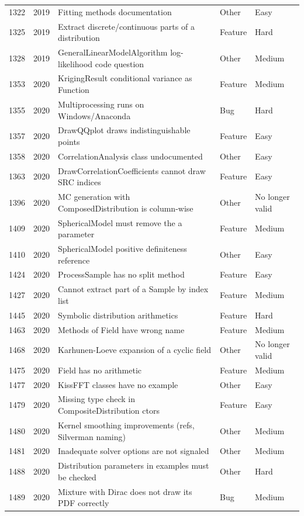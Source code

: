 \documentclass[a4paper,11pt]{article}
\begin{document}
\begin{longtable}{rrp{7.1cm}ll}
1322 & 2019 & Fitting methods documentation & Other & Easy \\
1325 & 2019 & Extract discrete/continuous parts of a distribution & Feature & Hard \\
1328 & 2019 & GeneralLinearModelAlgorithm log-likelihood code question & Other & Medium \\
1353 & 2020 & KrigingResult conditional variance as Function & Feature & Medium \\
1355 & 2020 & Multiprocessing runs on Windows/Anaconda & Bug & Hard \\
1357 & 2020 & DrawQQplot draws indistinguishable points & Feature & Easy \\
1358 & 2020 & CorrelationAnalysis class undocumented & Other & Easy \\
1363 & 2020 & DrawCorrelationCoefficients cannot draw SRC indices & Feature & Easy \\
1396 & 2020 & MC generation with ComposedDistribution is column-wise & Other & No longer valid \\
1409 & 2020 & SphericalModel must remove the a parameter & Feature & Medium \\
1410 & 2020 & SphericalModel positive definiteness reference & Other & Easy \\
1424 & 2020 & ProcessSample has no split method & Feature & Easy \\
1427 & 2020 & Cannot extract part of a Sample by index list & Feature & Medium \\
1445 & 2020 & Symbolic distribution arithmetics & Feature & Hard \\
1463 & 2020 & Methods of Field have wrong name & Feature & Medium \\
1468 & 2020 & Karhunen-Loeve expansion of a cyclic field & Other & No longer valid \\
1475 & 2020 & Field has no arithmetic & Feature & Medium \\
1477 & 2020 & KissFFT classes have no example & Other & Easy \\
1479 & 2020 & Missing type check in CompositeDistribution ctors & Feature & Easy \\
1480 & 2020 & Kernel smoothing improvements (refs, Silverman naming) & Other & Medium \\
1481 & 2020 & Inadequate solver options are not signaled & Other & Medium \\
1488 & 2020 & Distribution parameters in examples must be checked & Other & Hard \\
1489 & 2020 & Mixture with Dirac does not draw its PDF correctly & Bug & Medium \\

\end{longtable}
\end{document}

